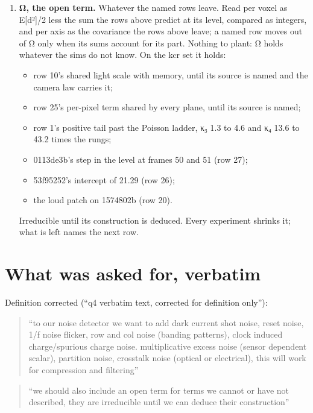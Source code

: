 \begin{enumerate}
\item \textbf{Ω, the open term.} Whatever the named rows leave. Read per voxel as E[d²]/2 less the sum the rows above predict at its level, compared as integers, and per axis as the covariance the rows above leave; a named row moves out of Ω only when its sums account for its part. Nothing to plant: Ω holds whatever the sims do not know. On the kcr set it holds:

\begin{itemize}
\item row 10's shared light scale with memory, until its source is named and the camera law carries it;
\item row 25's per-pixel term shared by every plane, until its source is named;
\item row 1's positive tail past the Poisson ladder, κ₃ 1.3 to 4.6 and κ₄ 13.6 to 43.2 times the rungs;
\item 0113de3b's step in the level at frames 50 and 51 (row 27);
\item 53f95252's intercept of 21.29 (row 26);
\item the loud patch on 1574802b (row 20).
\end{itemize}

Irreducible until its construction is deduced. Every experiment shrinks it; what is left names the next row.
\end{enumerate}

\section{\texorpdfstring{What was asked for, verbatim}{What was asked for, verbatim}}

Definition corrected (“q4 verbatim text, corrected for definition only”):

\begin{quote}
“to our noise detector we want to add dark current shot noise, reset noise, 1/f noise flicker, row and col noise (banding patterns), clock induced charge/spurious charge noise. multiplicative excess noise (sensor dependent scalar), partition noise, crosstalk noise (optical or electrical), this will work for compression and filtering”

\end{quote}

\begin{quote}
“we should also include an open term for terms we cannot or have not described, they are irreducible until we can deduce their construction”

\end{quote}

